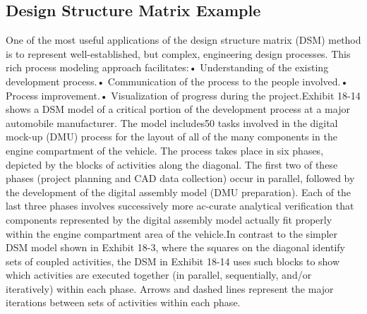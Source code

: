 \begin{appendices}
  \section{Design Structure Matrix Example}
  One of the most useful applications of the design structure matrix (DSM) method is to represent well-established, but complex, engineering design processes. This rich process modeling approach facilitates:• Understanding of the existing development process.• Communication of the process to the people involved.• Process improvement.• Visualization of progress during the project.Exhibit 18-14 shows a DSM model of a critical portion of the development process at a major automobile manufacturer. The model includes50 tasks involved in the digital mock-up (DMU) process for the layout of all of the many components in the engine compartment of the vehicle. The process takes place in six phases, depicted by the blocks of activities along the diagonal. The first two of these phases (project planning and CAD data collection) occur  in  parallel,  followed  by  the development  of  the  digital  assembly  model  (DMU preparation). Each of the last three phases involves successively more ac-curate analytical verification that components represented by the digital assembly model actually fit properly within the engine compartment area of the vehicle.In contrast to the simpler DSM model shown in Exhibit 18-3, where the squares on the diagonal identify sets of coupled activities, the DSM in Exhibit 18-14 uses such blocks to show which activities are executed together (in parallel, sequentially, and/or iteratively) within each phase. Arrows and dashed lines represent the major iterations between sets of activities within each phase.
\end{appendices}
